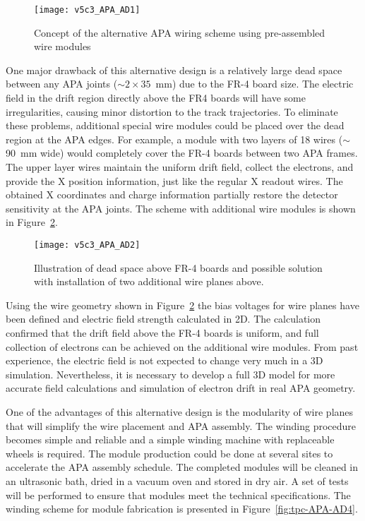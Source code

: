 \begin{figure}[htpb]
\centering
\texttt{[image: v5c3\_APA\_AD1]}
\caption[Concept of the alternative APA wiring scheme]{Concept of the alternative APA wiring scheme using pre-assembled wire modules}
\label{fig:tpc-APA-AD1}
\end{figure}

One major drawback of this alternative design is a relatively large dead space between any APA joints ($\sim 2 \times 35$~mm) due to the FR-4 board size.  The electric field in the drift region directly above the FR4 boards will have some irregularities, causing minor distortion to the track trajectories. To eliminate these problems, additional special wire modules could be placed over the dead region at the APA edges. For example, a module with two layers of 18 wires ($\sim$90~mm wide) would completely cover the FR-4 boards between two APA frames. The upper layer wires maintain the uniform drift field, collect the electrons, and provide the X position information, just like the regular X readout wires. The obtained X coordinates and charge information partially restore the detector sensitivity at the APA joints. The scheme with additional wire modules is shown in Figure~\ref{fig:tpc-APA-AD2}. 
                   
\begin{figure}[htpb]
\centering
\texttt{[image: v5c3\_APA\_AD2]}
\caption[Illustration of dead space above FR-4 boards and possible solution]{Illustration of dead space above FR-4 boards and possible solution with installation of two additional wire planes above.}
\label{fig:tpc-APA-AD2}
\end{figure}


Using the wire geometry shown in Figure~\ref{fig:tpc-APA-AD2} the bias voltages for wire planes have been defined and electric field strength calculated in 2D. The calculation confirmed that the drift field above the FR-4 boards is uniform, and full collection of electrons can be achieved on the additional wire modules. From past experience,  the electric field is not expected to change very much in a 3D simulation. Nevertheless, it is necessary to develop a full 3D model for more accurate field calculations and simulation of electron drift in real APA geometry.
  
One of the advantages of this alternative design is the modularity of wire planes that will simplify the wire placement and APA assembly. The winding procedure becomes simple and reliable and a simple winding machine with replaceable wheels is required. The module production could be done at several sites to accelerate the APA assembly schedule. The completed modules will be cleaned in an ultrasonic bath, dried in a vacuum oven and stored in dry air. A set of tests will be performed to ensure that modules meet the technical specifications. The winding scheme for module fabrication is presented in Figure~\ref{fig:tpc-APA-AD4}.
                              

